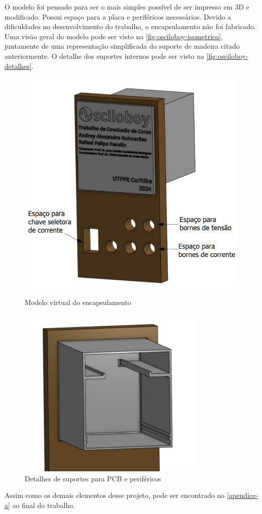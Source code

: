 O modelo foi pensado para ser o mais simples possível de ser impresso em 3D e modificado. Possui espaço para a placa e periféricos necessários.
Devido a dificuldades no desenvolvimento do trabalho, o encapsulamento não foi fabricado.
Uma visão geral do modelo pode ser visto na \autoref{fig:osciloboy-isometrico}, juntamente de uma representação simplificada do suporte de madeira citado anteriormente.
O detalhe dos suportes internos pode ser visto na \autoref{fig:osciloboy-detalhes}.

\begin{figure}[htb!]
    \caption{Modelo virtual do encapsulamento}
    \includegraphics[width=1.0\textwidth]{figuras/osciloboy-case-1.png}
    \label{fig:osciloboy-isometrico}
    \fonte{}
\end{figure}

\begin{figure}[htb!]
    \caption{Detalhes de suportes para PCB e periféricos}
    \label{fig:osciloboy-detalhes}
    \includegraphics[width=0.8\textwidth]{figuras/osciloboy-case-2.png}
    \fonte{}
\end{figure}

Assim como os demais elementos desse projeto, pode ser encontrado no \autoref{apendice-a} ao final do trabalho.

